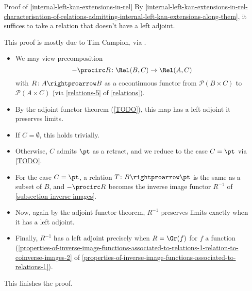 \begin{Proof}{Proof of \cref{internal-left-kan-extensions-in-rel}}%
    By \cref{internal-left-kan-extensions-in-rel-characterisation-of-relations-admitting-internal-left-kan-extensions-along-them}, it suffices to take a relation that doesn't have a left adjoint.

    This proof is mostly due to Tim Campion, via \cite{MO460693}.
    \begin{itemize}
        \item We may view precomposition
            \[
                -\procirc R%
                \colon%
                \Rel(B,C)%
                \to%
                \Rel(A,C)%
            \]%
            with $R\colon A\rightproarrow B$ as a cocontinuous functor from $\mathcal{P}(B\times C)$ to $\mathcal{P}(A\times C)$ (via \cref{relations-5} of \cref{relations}).
        \item By the adjoint functor theorem (\cref{TODO}), this map has a left adjoint \textiff it preserves limits.
        \item If $C=\emptyset$, this holds trivially.
        \item Otherwise, $C$ admits $\pt$ as a retract, and we reduce to the case $C=\pt$ via \cref{TODO}.
        \item For the case $C=\pt$, a relation $T\colon B\rightproarrow\pt$ is the same as a subset of $B$, and $-\procirc R$ becomes the inverse image functor $R^{-1}$ of \cref{subsection-inverse-images}.
        \item Now, again by the adjoint functor theorem, $R^{-1}$ preserves limits exactly when it has a left adjoint.
        \item Finally, $R^{-1}$ has a left adjoint precisely when $R=\Gr(f)$ for $f$ a function (\cref{properties-of-inverse-image-functions-associated-to-relations-1-relation-to-coinverse-images-2} of \cref{properties-of-inverse-image-functions-associated-to-relations-1}).
    \end{itemize}
    This finishes the proof.
\end{Proof}
